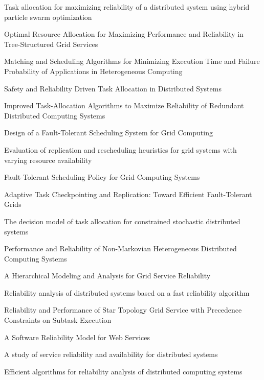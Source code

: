 \documentclass{cslthse-msc}
\begin{document}
\begin{thebibliography}{50}
Task allocation for maximizing reliability of a distributed system using hybrid particle swarm optimization

Optimal Resource Allocation for Maximizing Performance and Reliability in Tree-Structured Grid Services 

Matching and Scheduling Algorithms for Minimizing Execution Time and Failure Probability of Applications in Heterogeneous Computing

Safety and Reliability Driven Task Allocation in Distributed Systems

Improved Task-Allocation Algorithms to Maximize Reliability of Redundant Distributed Computing Systems 

Design of a Fault-Tolerant Scheduling System for Grid Computing

Evaluation of replication and rescheduling heuristics for grid systems with varying resource availability

Fault-Tolerant Scheduling Policy for Grid Computing Systems

Adaptive Task Checkpointing and Replication: Toward Efficient Fault-Tolerant Grids

The decision model of task allocation for constrained stochastic distributed systems

Performance and Reliability of Non-Markovian Heterogeneous Distributed Computing Systems

A Hierarchical Modeling and Analysis for Grid Service Reliability

Reliability analysis of distributed systems based on a fast reliability algorithm

Reliability and Performance of Star Topology Grid Service with Precedence Constraints on Subtask Execution

A Software Reliability Model for Web Services

A study of service reliability and availability for distributed systems

Efficient algorithms for reliability analysis of distributed computing systems


\end{thebibliography}
\end{document}
